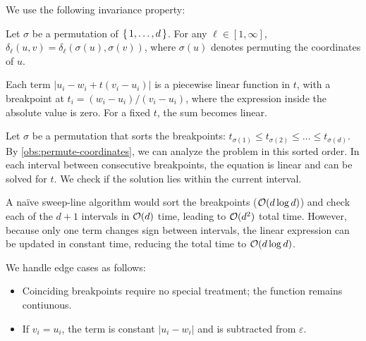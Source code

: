 We use the following invariance property:
\begin{observation}\label{obs:permute-coordinates}
	Let \(\sigma\) be a permutation of \(\set{1, \dots, d}\). For any \(\ell \in [1, \infty]\), \(\delta_\ell(u, v) = \delta_\ell(\sigma(u), \sigma(v))\), where \(\sigma(u)\) denotes permuting the coordinates of \(u\).
\end{observation}

Each term \(|u_i - w_i + t (v_i - u_i)|\) is a piecewise linear function in \(t\), with a breakpoint at \(t_i = (w_i - u_i)/(v_i - u_i)\), where the expression inside the absolute value is zero. For a fixed \(t\), the sum becomes linear.

Let \(\sigma\) be a permutation that sorts the breakpoints: \(t_{\sigma(1)} \leq t_{\sigma(2)} \leq \dots \leq t_{\sigma(d)}\). By \cref{obs:permute-coordinates}, we can analyze the problem in this sorted order. In each interval between consecutive breakpoints, the equation is linear and can be solved for \(t\). We check if the solution lies within the current interval.

A na\"ive sweep-line algorithm would sort the breakpoints (\(\mathcal{O}(d \log d)\)) and check each of the \(d+1\) intervals in \(\mathcal{O}(d)\) time, leading to \(\mathcal{O}(d^2)\) total time. However, because only one term changes sign between intervals, the linear expression can be updated in constant time, reducing the total time to \(\mathcal{O}(d \log d)\).

We handle edge cases as follows:
\begin{itemize}
	\item Coinciding breakpoints require no special treatment; the function remains contiunous.
	\item If \(v_i = u_i\), the term is constant \(|u_i - w_i|\) and is subtracted from \(\varepsilon\).
\end{itemize}

